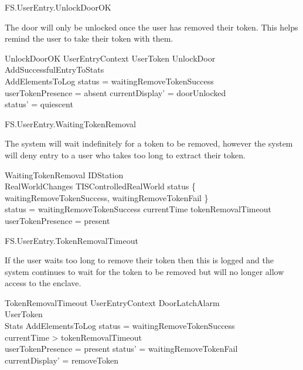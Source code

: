 \begin{traceunit}{FS.UserEntry.UnlockDoorOK}
\end{traceunit}


The door will only be unlocked once the user has removed their token.
This helps remind the user to take their token with them.

\begin{schema}{UnlockDoorOK}
        UserEntryContext
\also
      \Xi UserToken
\also
        UnlockDoor
\\      AddSuccessfulEntryToStats
\\      AddElementsToLog
\where
        status = waitingRemoveTokenSuccess
\\      userTokenPresence = absent
\also
        currentDisplay' = doorUnlocked
\\      status' = quiescent
\end{schema}

\begin{traceunit}{FS.UserEntry.WaitingTokenRemoval}
\end{traceunit}

The system will wait indefinitely for a token to be removed, however
the system will deny entry to a user who takes too long to extract
their token.

\begin{schema}{WaitingTokenRemoval}
        \Xi IDStation
\\      RealWorldChanges
\also
        \Xi TISControlledRealWorld
\where
        status \in \{ waitingRemoveTokenSuccess, 
waitingRemoveTokenFail \}
\\      status = waitingRemoveTokenSuccess \implies currentTime \leq tokenRemovalTimeout 
\\      userTokenPresence = present
\end{schema}

\begin{traceunit}{FS.UserEntry.TokenRemovalTimeout}
\end{traceunit}

If the user waits too long to remove their token then this is logged
and the system continues to wait for the token to be removed but will
no longer allow access to the enclave.

\begin{schema}{TokenRemovalTimeout}
        UserEntryContext
\also
        \Xi DoorLatchAlarm
\\      \Xi UserToken
\\      \Xi Stats       
\also
        AddElementsToLog
\where
        status = waitingRemoveTokenSuccess
\\      currentTime > tokenRemovalTimeout 
\\      userTokenPresence = present
\also
        status' = waitingRemoveTokenFail
\\      currentDisplay' = removeToken
\end{schema}


